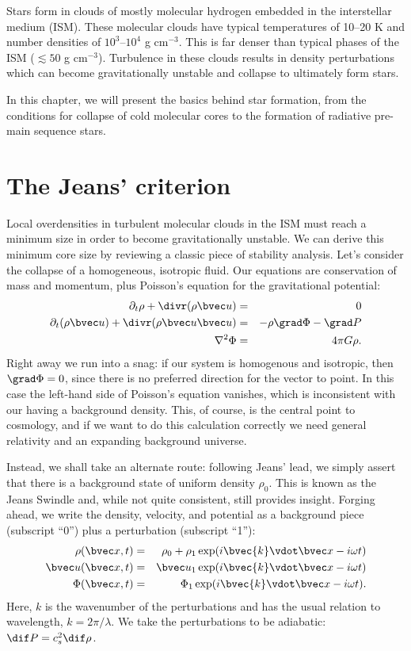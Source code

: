 Stars form in clouds of mostly molecular hydrogen embedded in the interstellar medium (ISM).
These molecular clouds have typical temperatures of 10--20 K and number densities of $10^3$--$10^4$ g cm$^{-3}$.
This is far denser than typical phases of the ISM ($\lesssim50$ g cm$^{-3}$).
Turbulence in these clouds results in density perturbations which can become gravitationally unstable and collapse to ultimately form stars.

In this chapter, we will present the basics behind star formation, from the conditions for collapse of cold molecular cores to the formation of radiative pre-main sequence stars.

\section{The Jeans' criterion}

Local overdensities in turbulent molecular clouds in the ISM must reach a minimum size in order to become gravitationally unstable.
We can derive this minimum core size by reviewing a classic piece of stability analysis.
Let's consider the collapse of a homogeneous, isotropic fluid. Our equations are conservation of mass and momentum, plus Poisson's equation for the gravitational potential:
\begin{eqnarray}
\partial_{t}\rho + \divr(\rho \vu) &=& 0\label{e.jeans-mass-cons}\\
\partial_{t}(\rho\vu) + \divr(\rho\vu\vu) &=& - \rho \grad\Phi - \grad P\label{e.jeans-momentum}\\
\nabla^{2} \Phi &=& 4\pi G \rho\label{e.jeans-poisson}.
\end{eqnarray}
Right away we run into a snag: if our system is homogenous and isotropic, then $\grad\Phi = 0$, since there is no preferred direction for the vector to point. In this case the left-hand side of Poisson's equation vanishes, which is inconsistent with our having a background density.  This, of course, is the central point to cosmology, and if we want to do this calculation correctly we need general relativity and an expanding background universe.

Instead, we shall take an alternate route: following Jeans' lead, we simply assert that there is a background state of uniform density $\rho_{0}$. This is known as the Jeans Swindle \citep[c.f.,][]{binney:1987} and, while not quite consistent, still provides insight.
Forging ahead, we write the density, velocity, and potential as a background piece (subscript ``0'') plus a perturbation (subscript ``1''):
\begin{eqnarray*}
\rho(\vx,t) &=& \rho_{0} + \rho_{1}\exp(i\bvec{k}\vdot\vx - i\omega t)\\
\vu(\vx,t) &=& \vu_{1}\exp(i\bvec{k}\vdot\vx - i\omega t)\\
\Phi(\vx,t) &=& \Phi_{1}\exp(i\bvec{k}\vdot\vx - i\omega t).
\end{eqnarray*}
Here, $k$ is the wavenumber of the perturbations and has the usual relation to wavelength, $k = 2\pi/\lambda$.
We take the perturbations to be adiabatic: $\dif P = c_{s}^{2}\dif\rho$.

